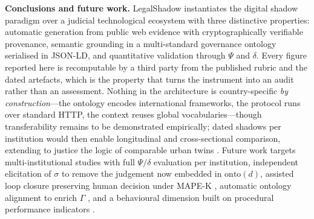 \documentclass[engproc,proceedingpaper,submit,moreauthors]{Definitions/mdpi}
\begin{document}
\textbf{Conclusions and future work.} LegalShadow instantiates the digital shadow paradigm over a judicial technological ecosystem with three distinctive properties: automatic generation from public web evidence with cryptographically verifiable provenance, semantic grounding in a multi-standard governance ontology serialised in JSON-LD, and quantitative validation through $\Psi$ and $\delta$. Every figure reported here is recomputable by a third party from the published rubric and the dated artefacts, which is the property that turns the instrument into an audit rather than an assessment. Nothing in the architecture is country-specific \emph{by construction}---the ontology encodes international frameworks, the protocol runs over standard HTTP, the context reuses global vocabularies---though transferability remains to be demonstrated empirically; dated shadows per institution would then enable longitudinal and cross-sectional comparison, extending to justice the logic of comparable urban twins \cite{Shahat2021}. Future work targets multi-institutional studies with full $\Psi/\delta$ evaluation per institution, independent elicitation of $\sigma$ to remove the judgement now embedded in $\mathrm{onto}(d)$, assisted loop closure preserving human decision under MAPE-K \cite{Kephart2003}, automatic ontology alignment to enrich $\Gamma$ \cite{Hogan2021}, and a behavioural dimension built on procedural performance indicators \cite{Medvedeva2020}.

\vspace{6pt}

\end{document}
